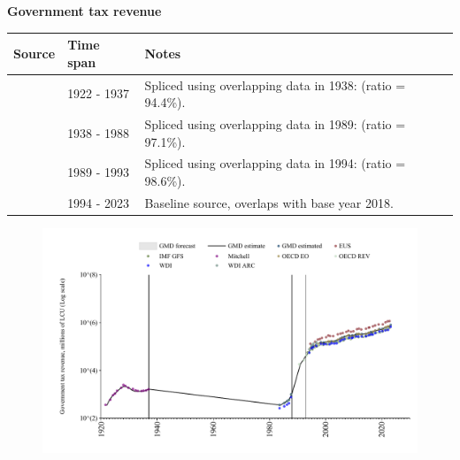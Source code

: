 \documentclass[12pt,a4paper,landscape]{article}
\begin{document}
\begin{adjustbox}{max totalsize={\paperwidth}{\paperheight},center}
\begin{minipage}[t][\textheight][t]{\textwidth}
\vspace*{0.5cm}
{}
\begin{center}
{\Large\bfseries Government tax revenue}
\end{center}
\vspace{0.5cm}
\begin{table}[H]
\centering
\small
\begin{tabular}{|l|l|l|}
\hline
\textbf{Source} & \textbf{Time span} & \textbf{Notes} \\
\hline
\rowcolor{white}\cite{Mitchell}& 1922 - 1937 &Spliced using overlapping data in 1938: (ratio = 94.4\%). \\
\rowcolor{lightgray}\cite{GMD_estimated}& 1938 - 1988 &Spliced using overlapping data in 1989: (ratio = 97.1\%). \\
\rowcolor{white}\cite{OECD_REV}& 1989 - 1993 &Spliced using overlapping data in 1994: (ratio = 98.6\%). \\
\rowcolor{lightgray}\cite{GMD_estimated}& 1994 - 2023 &Baseline source, overlaps with base year 2018. \\
\hline
\end{tabular}
\end{table}
\begin{figure}[H]
\centering
\includegraphics[width=\textwidth,height=0.6\textheight,keepaspectratio]{graphs/POL_govtax.pdf}
\end{figure}
\end{minipage}
\end{adjustbox}
\end{document}
